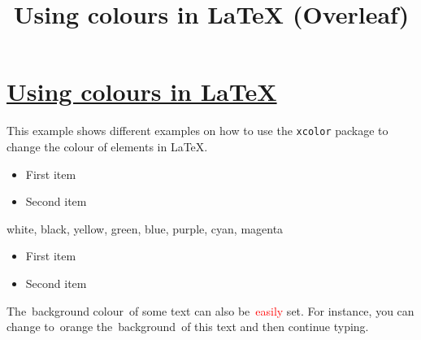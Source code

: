 \documentclass[a4paper,11pt]{article}
\title{Using colours in \LaTeX{} (Overleaf)}
\author{}
\begin{document}



\maketitle %



\section{\href{https://www.overleaf.com/learn/latex/Using\_colours\_in\_LaTeX}{Using
    colours in \LaTeX}}

\vspace{2em}




This example shows different examples on how to use the
\texttt{xcolor} package to change the colour of elements in \LaTeX.

\begin{itemize}
  \color{blue}
\item First item

\item Second item

\end{itemize}

\noindent {\color{red} \rule{\linewidth}{0.5mm} }



{\color{white} white}, {\color{black} black}, {\color{yellow} yellow},
{\color{green} green}, {\color{blue} blue}, {\color{purple} purple},
{\color{cyan} cyan}, {\color{magenta} magenta}


\begin{itemize}
  \color{ForestGreen}
\item First item

\item Second item

\end{itemize}

\noindent {\color{RubineRed} \rule{\linewidth}{0.5mm}}


The~background colour~of some text can also be~\textcolor{red}{easily}
set. For instance, you can change to~orange the~background~of
\colorbox{BurntOrange}{this text} and then continue typing.
\end{document}
